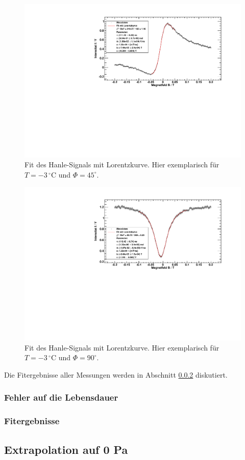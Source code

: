 \begin{figure}[H]
\begin{center}
  \includegraphics[width=\textwidth]{../img/fit_45_m03.pdf}
  \caption{Fit des Hanle-Signals mit Lorentzkurve. Hier exemplarisch für $T=-3\,{}^\circ$C und $\Phi=45^\circ$.}
  \label{img:fit:lorentz:45}
\end{center}
\end{figure}
\begin{figure}[H]
\begin{center}
  \includegraphics[width=\textwidth]{../img/fit_90_m03.pdf}
  \caption{Fit des Hanle-Signals mit Lorentzkurve. Hier exemplarisch für $T=-3\,{}^\circ$C und $\Phi=90^\circ$.}
  \label{img:fit:lorentz:90}
\end{center}
\end{figure}
Die Fitergebnisse aller Messungen werden in Abschnitt \ref{subsub:fitresults} diskutiert.

\subsubsection{Fehler auf die Lebensdauer}
\subsubsection{Fitergebnisse}
\label{subsub:fitresults}




\subsection{Extrapolation auf 0 Pa}